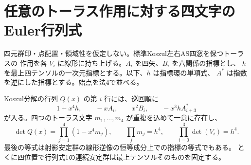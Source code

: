 \section{任意のトーラス作用に対する四文字のEuler行列式}
\label{sec:torus-euler-characters}
四元群印・点配置・領域性を仮定しない。標準Koszul左右AS四窓を保つトーラスの
作用を各 $V_i$ に線形に持ち上げる。$A_i$ を四矢、$B_i$ を六関係の指標とし、
$h$ を最上四テンソルの一次元指標とする。以下、$h$ は指標環の単項式、
$A^*$ は指数を逆にした指標とする。始点を法4で並べる。
\begin{theorem}\label{thm:torus-euler-characters}
Koszul分解の行列 $Q(x)$ の第 $i$ 行には、巡回順に
\[
 1+x^4h,\qquad -x A_i,\qquad x^2 B_i,\qquad -x^3 h A_{i+3}^*
\]
が入る。四つのトーラス文字 $m_1,\dots,m_4$ が重複を込めて一意に存在し、
\[
 \det Q(x)=\prod_{j=1}^4(1-x^4m_j),\qquad
 \prod_j m_j=h^4,\qquad
 \prod_{i=0}^3\det(V_i)=h^4 .
\]
最後の等式は射影安定群の線形逆像の恒等成分上での指標の等式でもある。
とくに四位置で行列式1の連続安定群は最上テンソルそのものを固定する。
\end{theorem}
